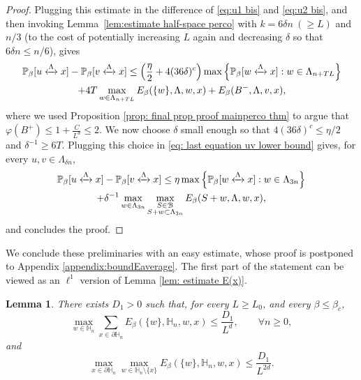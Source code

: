 \documentclass[11pt,a4paper]{article}
\numberwithin{equation}{section}
\theoremstyle{plain}
\newtheorem{Lem}[Thm]{Lemma}
\theoremstyle{definition}
\newcommand{\connect}{\xleftrightarrow}
\begin{document}
\begin{proof}
Plugging this estimate in the difference of \eqref{eq:u1 bis} and \eqref{eq:u2 bis}, and then invoking Lemma~\ref{lem:estimate half-space perco} with $k=6\delta n\:(\geq L)$ and $n/3$ (to the cost of potentially increasing $L$ again and decreasing $\delta$ so that $6\delta n\leq n/6$), gives 
\begin{multline}\label{eq: last equation uv lower bound}
\mathbb P_\beta[u\connect{\Lambda\:}x]-\mathbb P_\beta[v\connect{\Lambda\:}x]\le \left(\frac{\eta}{2}+4(36\delta)^c\right)\max\Big\{\mathbb P_\beta[w\connect{\Lambda\:}x]:w\in \Lambda_{n+TL}\Big\}\\+4T\max_{w\in \Lambda_{n+TL}}E_\beta(\{w\},\Lambda,w,x)+E_\beta(B^-,\Lambda,v,x) ,
\end{multline}
where we used Proposition \ref{prop: final prop proof mainperco thm} to argue that $\varphi(B^+)\leq 1+\frac{C}{L^d}\leq 2$. We now choose $\delta$ small enough so that $4(36\delta)^c\leq \eta/2$ and $\delta^{-1}\geq 6T$. Plugging this choice in \eqref{eq: last equation uv lower bound} gives, for every $u,v\in \Lambda_{\delta n}$,
\begin{multline}
	\mathbb P_\beta[u\connect{\Lambda\:}x]-\mathbb P_\beta[v\connect{\Lambda\:}x]\le \eta \max\Big\{\mathbb P_\beta[w\connect{\Lambda\:}x]:w\in \Lambda_{3n}\Big\}\\+ \delta^{-1}\max_{w\in \Lambda_{3n}}\max_{\substack{S\in \mathcal B\\S+w\subset \Lambda_{3n}}}E_\beta(S+w,\Lambda,w,x),
\end{multline}
and concludes the proof.
\end{proof}


We conclude these preliminaries with an easy estimate, whose proof is postponed to Appendix \ref{appendix:boundEaverage}. The first part of the statement can be viewed as an $\ell^1$ version of Lemma \ref{lem: estimate E(x)}.

\begin{Lem}\label{lem: bound non local error singleton perco} There exists $D_1>0$ such that, for every $L\geq L_0$, and every $\beta\leq \beta_c$, 
\begin{equation}\label{eq:non local term 1}
	\max_{w\in \mathbb H_n}\sum_{x\in \partial \mathbb H_n}{E}_\beta(\{w\},\mathbb H_n,w,x)\leq \frac{D_1}{L^d}, \qquad \forall n\geq 0,
\end{equation}
and 
\begin{equation}\label{eq:non local term 2}
	\max_{x\in \partial \mathbb H_n}\max_{w\in \mathbb H_n\setminus \{x\}}E_\beta(\{w\},\mathbb H_n,w,x)\leq \frac{D_1}{L^{2d}}.
\end{equation}
\end{Lem}
\end{document}
